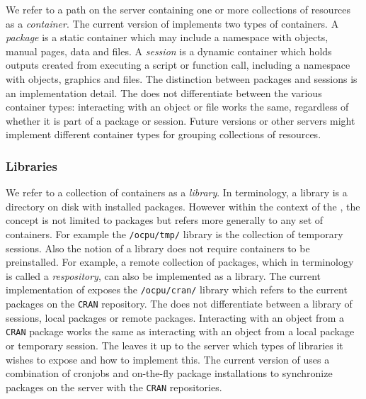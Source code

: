 We refer to a path on the server containing one or more collections of resources as a \emph{container}. The current version of \OpenCPU implements two types of containers. A \emph{package} is a static container which may include a namespace with \R objects, manual pages, data and files.  A \emph{session} is a dynamic container which holds outputs created from executing a script or function call, including a namespace with \R objects, graphics and files. The distinction between packages and sessions is an implementation detail. The \API does not differentiate between the various container types: interacting with an object or file works the same, regardless of whether it is part of a package or session. Future versions or other servers might implement different container types for grouping collections of resources.

\subsubsection{Libraries}

We refer to a collection of containers as a \emph{library}. In \R terminology, a library is a directory on disk with installed packages. However within the context of the \API, the concept is not limited to packages but refers more generally to any set of containers. For example the \texttt{/ocpu/tmp/} library is the collection of temporary sessions. Also the \API notion of a library does not require containers to be preinstalled. For example, a remote collection of packages, which in \R terminology is called a \emph{respository}, can also be implemented as a library. The current implementation of \OpenCPU exposes the \texttt{/ocpu/cran/} library which refers to the current packages on the \texttt{CRAN} repository. The \API does not differentiate between a library of sessions, local packages or remote packages. Interacting with an object from a \texttt{CRAN} package works the same as interacting with an object from a local package or temporary session. The \API leaves it up to the server which types of libraries it wishes to expose and how to implement this. The current version of \OpenCPU uses a combination of cronjobs and on-the-fly package installations to synchronize packages on the server with the \texttt{CRAN} repositories.
